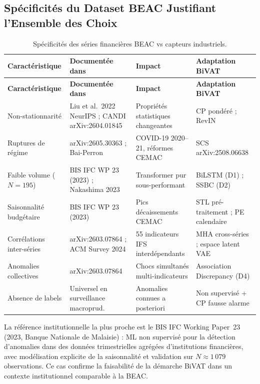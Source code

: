 \documentclass[12pt,a4paper]{article}
\begin{document}
\subsection{Spécificités du Dataset BEAC Justifiant l'Ensemble des Choix}

\begin{longtable}{p{3.2cm}p{3.5cm}p{3cm}p{5cm}}
\caption{Spécificités des séries financières BEAC vs capteurs industriels.}
\label{tab:beac-specs}\\
\toprule
\textbf{Caractéristique} & \textbf{Documentée dans} &
\textbf{Impact} & \textbf{Adaptation BiVAT} \\
\midrule
\endfirsthead
\toprule
\textbf{Caractéristique} & \textbf{Documentée dans} &
\textbf{Impact} & \textbf{Adaptation BiVAT} \\
\midrule
\endhead
\bottomrule\endlastfoot
Non-stationnarité &
Liu et al.\ 2022 NeurIPS ; CANDI arXiv:2604.01845 &
Propriétés statistiques changeantes &
CP pondéré ; RevIN \\
\midrule
Ruptures de régime &
arXiv:2605.30363 ; Bai-Perron &
COVID-19 2020--21, réformes CEMAC &
SCS arXiv:2508.06638 \\
\midrule
Faible volume ($N=195$) &
BIS IFC WP 23 (2023) ; Nakashima 2023 &
Transformer pur sous-performant &
BiLSTM (D1) ; SSBC (D2) \\
\midrule
Saisonnalité budgétaire &
BIS IFC WP 23 (2023) &
Pics décaissements CEMAC &
STL pré-traitement ; PE calendaire \\
\midrule
Corrélations inter-séries &
arXiv:2603.07864 ; ACM Survey 2024 &
55 indicateurs IFS interdépendants &
MHA cross-séries ; espace latent VAE \\
\midrule
Anomalies collectives &
arXiv:2603.07864 &
Chocs simultanés multi-indicateurs &
Association Discrepancy (D4) \\
\midrule
Absence de labels &
Universel en surveillance macroprud. &
Anomalies connues a posteriori &
Non supervisé + CP fausse alarme \\
\end{longtable}

La référence institutionnelle la plus proche est le BIS IFC Working Paper~23
(2023, Banque Nationale de Malaisie) : ML non supervisé pour la détection
d'anomalies dans des données trimestrielles agrégées d'institutions financières,
avec modélisation explicite de la saisonnalité et validation sur $N \approx
1\,079$ observations. Ce cas confirme la faisabilité de la démarche BiVAT dans
un contexte institutionnel comparable à la BEAC.
\end{document}
